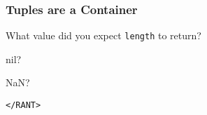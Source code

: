 \documentclass{beamer}
\begin{document}
\begin{frame}
\frametitle{Tuples are a Container}
\begin{center}
What value did you expect {\tt length} to return?

\vspace{32pt}

nil?

\vspace{32pt}

NaN?
\end{center}
\end{frame}
\begin{frame}
\begin{center}\tt \Huge{</RANT>}\end{center}
\end{frame}
\end{document}
